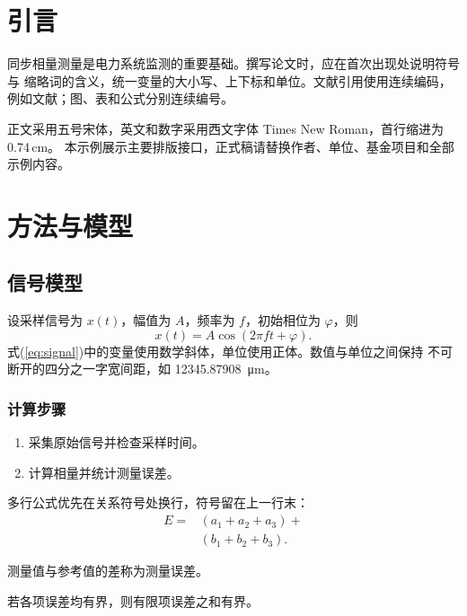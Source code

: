 \documentclass{csee}
\begin{document}
\maketitle
\makeabstract

\section{引言}
同步相量测量是电力系统监测的重要基础。撰写论文时，应在首次出现处说明符号与
缩略词的含义，统一变量的大小写、上下标和单位。文献引用使用连续编码，
例如文献\cite{ge2001,zhang2002}；图、表和公式分别连续编号。

正文采用五号宋体，英文和数字采用西文字体 Times New Roman，首行缩进为 0.74\,cm。
本示例展示主要排版接口，正式稿请替换作者、单位、基金项目和全部示例内容。

\section{方法与模型}
\subsection{信号模型}
设采样信号为 $x(t)$，幅值为 $A$，频率为 $f$，初始相位为 $\varphi$，则
\begin{equation}
  x(t)=A\cos(2\pi ft+\varphi).
  \label{eq:signal}
\end{equation}
式(\ref{eq:signal})中的变量使用数学斜体，单位使用正体。数值与单位之间保持
不可断开的四分之一字宽间距，如 \qty{12345.87908}{\micro\metre}。

\subsubsection{计算步骤}
\begin{enumerate}
  \item 采集原始信号并检查采样时间。
  \item 计算相量并统计测量误差。
\end{enumerate}
多行公式优先在关系符号处换行，符号留在上一行末：
\begin{equation}
  \begin{aligned}
    E ={}& (a_1+a_2+a_3) +{}\\
         & (b_1+b_2+b_3).
  \end{aligned}
  \label{eq:error}
\end{equation}

\begin{cseedefinition}[测量误差]\label{def:error}
测量值与参考值的差称为测量误差。
\end{cseedefinition}
\begin{cseetheorem}\label{thm:bound}
若各项误差均有界，则有限项误差之和有界。
\end{cseetheorem}
\end{document}
